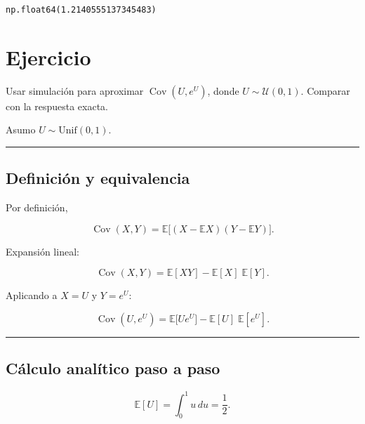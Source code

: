 \documentclass[11pt]{article}
\makeatletter
\newcommand{\boxspacing}{\kern\kvtcb@left@rule\kern\kvtcb@boxsep}
\newcommand{\prompt}[4]{
        {\ttfamily\llap{{\color{#2}[#3]:\hspace{3pt}#4}}\vspace{-\baselineskip}}
    }
\makeatother
\begin{document}
            \begin{tcolorbox}[breakable, size=fbox, boxrule=.5pt, pad at break*=1mm, opacityfill=0]
\prompt{Out}{outcolor}{ }{\boxspacing}
\begin{Verbatim}[commandchars=\\\{\}]
np.float64(1.2140555137345483)
\end{Verbatim}
\end{tcolorbox}
        
    \hypertarget{ejercicio}{%
\section{Ejercicio}\label{ejercicio}}

Usar simulación para aproximar \(\operatorname{{Cov}}(U, e^U)\), donde
\(U \sim \mathcal U(0,1)\). Comparar con la respuesta exacta.

    Asumo \(U\sim\mathrm{Unif}(0,1)\).

\begin{center}\rule{0.5\linewidth}{0.5pt}\end{center}

\hypertarget{definiciuxf3n-y-equivalencia}{%
\subsection{Definición y
equivalencia}\label{definiciuxf3n-y-equivalencia}}

Por definición,

\[
\operatorname{Cov}(X,Y)=\mathbb{E}\big[(X-\mathbb{E}X)(Y-\mathbb{E}Y)\big].
\]

Expansión lineal:

\[
\operatorname{Cov}(X,Y)=\mathbb{E}[XY]-\mathbb{E}[X]\;\mathbb{E}[Y].
\]

Aplicando a \(X=U\) y \(Y=e^{U}\):

\[
\operatorname{Cov}(U,e^{U})=\mathbb{E}\!\big[U e^{U}\big]-\mathbb{E}[U]\;\mathbb{E}[e^{U}].
\]

\begin{center}\rule{0.5\linewidth}{0.5pt}\end{center}

\hypertarget{cuxe1lculo-analuxedtico-paso-a-paso}{%
\subsection{Cálculo analítico paso a
paso}\label{cuxe1lculo-analuxedtico-paso-a-paso}}

\[
\mathbb{E}[U]=\int_{0}^{1}u\,du=\frac12.
\]
\end{document}
